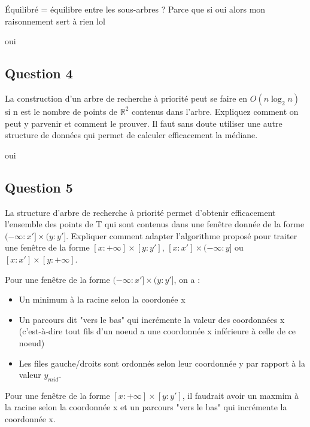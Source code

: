 \documentclass{article}
\newcommand{\gray}{\color{gray}}
\newcommand{\black}{\color{black}}
\begin{document}
Équilibré = équilibre entre les sous-arbres ? Parce que si oui alors mon raisonnement sert à rien lol

\black

oui %

\subsection{Question 4} La construction d'un arbre de recherche à priorité peut se faire en $O(n \log_2 n)$ si n est le nombre de points de $\mathbb{R}^2$ contenus dans l'arbre. 
Expliquez comment on peut y parvenir et comment le prouver. 
Il faut sans doute utiliser une autre structure de données qui permet de calculer efficacement la médiane.

\bigskip

oui %

\newpage

\subsection{Question 5} La structure d'arbre de recherche à priorité permet d'obtenir efficacement l'ensemble
des points de T qui sont contenus dans une fenêtre donnée de la forme \\$(- \infty : x'] \times (y : y']$.
Expliquer comment adapter l'algorithme proposé pour traiter une fenêtre de la forme $[x : + \infty] \times [y : y']$,
$[x : x'] \times (- \infty : y]$ ou $[x : x'] \times [y : + \infty]$.


\bigskip

\gray
Pour une fenêtre de la forme $(- \infty : x'] \times (y : y']$, on a :
\begin{itemize}
    \item Un minimum à la racine selon la coordonée x
    \item Un parcours dit "vers le bas" qui incrémente la valeur des coordonnées x 
    (c'est-à-dire tout fils d'un noeud a une coordonnée x inférieure à celle de ce noeud)
    \item Les files gauche/droits sont ordonnés selon leur coordonnée y par rapport à la valeur $y_{mid}$.
\end{itemize}
Pour une fenêtre de la forme $[x : + \infty] \times [y : y']$, il faudrait avoir un maxmim à la racine selon la coordonnée x et un parcours "vers le bas" qui incrémente la coordonnée x. 
\end{document}
